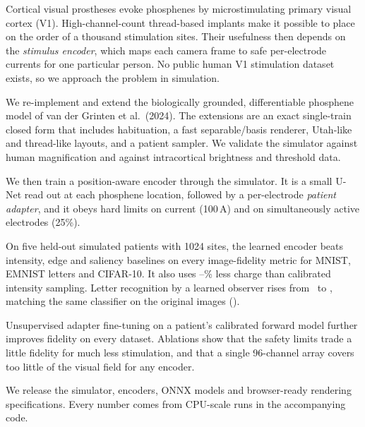 Cortical visual prostheses evoke phosphenes by microstimulating primary visual cortex (V1). High-channel-count thread-based implants make it possible to place on the order of a thousand stimulation sites. Their usefulness then depends on the \emph{stimulus encoder}, which maps each camera frame to safe per-electrode currents for one particular person. No public human V1 stimulation dataset exists, so we approach the problem in simulation.

We re-implement and extend the biologically grounded, differentiable phosphene model of van der Grinten et al.\ (2024). The extensions are an exact single-train closed form that includes habituation, a fast separable/basis renderer, Utah-like and thread-like layouts, and a patient sampler. We validate the simulator against human magnification and against intracortical brightness and threshold data.

We then train a position-aware encoder through the simulator. It is a small U-Net read out at each phosphene location, followed by a per-electrode \emph{patient adapter}, and it obeys hard limits on current (100\,\textmu A) and on simultaneously active electrodes (25\%).

On five held-out simulated patients with 1024 sites, the learned encoder beats intensity, edge and saliency baselines on every image-fidelity metric for MNIST, EMNIST letters and CIFAR-10. It also uses \NumChargeSaveMin--\NumChargeSaveMax\% less charge than calibrated intensity sampling. Letter recognition by a learned observer rises from \NumLettersIntAcc\ to \NumLettersLearnAcc, matching the same classifier on the original images (\NumLettersCeil).

Unsupervised adapter fine-tuning on a patient's calibrated forward model further improves fidelity on every dataset. Ablations show that the safety limits trade a little fidelity for much less stimulation, and that a single 96-channel array covers too little of the visual field for any encoder.

We release the simulator, encoders, ONNX models and browser-ready rendering specifications. Every number comes from CPU-scale runs in the accompanying code.
